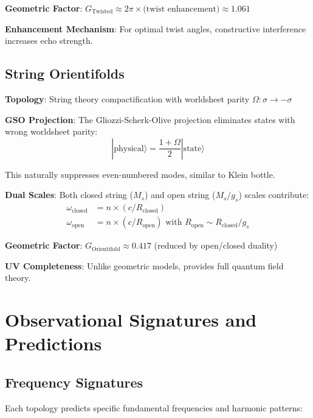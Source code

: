 \documentclass[11pt,a4paper]{article}
\begin{document}
\textbf{Geometric Factor}: $G_{\text{Twisted}} \approx 2\pi \times \text{(twist enhancement)} \approx 1.061$

\textbf{Enhancement Mechanism}: For optimal twist angles, constructive interference increases echo strength.

\subsection{String Orientifolds}

\textbf{Topology}: String theory compactification with worldsheet parity $\Omega: \sigma \to -\sigma$

\textbf{GSO Projection}: The Gliozzi-Scherk-Olive projection eliminates states with wrong worldsheet parity:
\begin{equation}
|\text{physical}\rangle = \frac{1 + \Omega}{2} |\text{state}\rangle
\end{equation}

This naturally suppresses even-numbered modes, similar to Klein bottle.

\textbf{Dual Scales}: Both closed string ($M_s$) and open string ($M_s/g_s$) scales contribute:
\begin{align}
\omega_{\text{closed}} &= n \times (c/R_{\text{closed}}) \\
\omega_{\text{open}} &= n \times (c/R_{\text{open}}) \text{ with } R_{\text{open}} \sim R_{\text{closed}}/g_s
\end{align}

\textbf{Geometric Factor}: $G_{\text{Orientifold}} \approx 0.417$ (reduced by open/closed duality)

\textbf{UV Completeness}: Unlike geometric models, provides full quantum field theory.

\section{Observational Signatures and Predictions}

\subsection{Frequency Signatures}

Each topology predicts specific fundamental frequencies and harmonic patterns:
\end{document}
